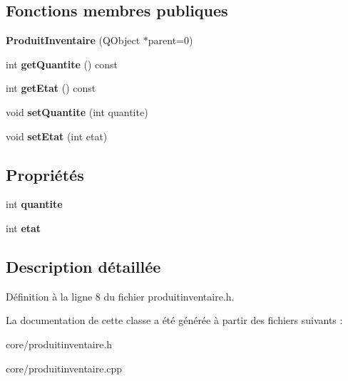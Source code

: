 \subsection*{Fonctions membres publiques}
\begin{DoxyCompactItemize}
\item 
\hypertarget{class_core_1_1_produit_inventaire_a9e523fdd7b5989520a88066561017121}{
{\bfseries ProduitInventaire} (QObject $\ast$parent=0)}
\label{d4/d53/class_core_1_1_produit_inventaire_a9e523fdd7b5989520a88066561017121}

\item 
\hypertarget{class_core_1_1_produit_inventaire_a10e08d895e2513a59fea74e580aac7e8}{
int {\bfseries getQuantite} () const }
\label{d4/d53/class_core_1_1_produit_inventaire_a10e08d895e2513a59fea74e580aac7e8}

\item 
\hypertarget{class_core_1_1_produit_inventaire_ad5dd92f4476fad4757cb10462f4eefb1}{
int {\bfseries getEtat} () const }
\label{d4/d53/class_core_1_1_produit_inventaire_ad5dd92f4476fad4757cb10462f4eefb1}

\item 
\hypertarget{class_core_1_1_produit_inventaire_a59d68c5950101aa30a9ce8dc7a4b0e45}{
void {\bfseries setQuantite} (int quantite)}
\label{d4/d53/class_core_1_1_produit_inventaire_a59d68c5950101aa30a9ce8dc7a4b0e45}

\item 
\hypertarget{class_core_1_1_produit_inventaire_aff84b8ce540258afbbfb958fd54ed316}{
void {\bfseries setEtat} (int etat)}
\label{d4/d53/class_core_1_1_produit_inventaire_aff84b8ce540258afbbfb958fd54ed316}

\end{DoxyCompactItemize}
\subsection*{Propriétés}
\begin{DoxyCompactItemize}
\item 
\hypertarget{class_core_1_1_produit_inventaire_a7059db71032dbbeb3391fd6fdd6d9ea7}{
int {\bfseries quantite}}
\label{d4/d53/class_core_1_1_produit_inventaire_a7059db71032dbbeb3391fd6fdd6d9ea7}

\item 
\hypertarget{class_core_1_1_produit_inventaire_af550b34aacf39149fc19257bcb990b27}{
int {\bfseries etat}}
\label{d4/d53/class_core_1_1_produit_inventaire_af550b34aacf39149fc19257bcb990b27}

\end{DoxyCompactItemize}


\subsection{Description détaillée}


Définition à la ligne 8 du fichier produitinventaire.h.



La documentation de cette classe a été générée à partir des fichiers suivants :\begin{DoxyCompactItemize}
\item 
core/produitinventaire.h\item 
core/produitinventaire.cpp\end{DoxyCompactItemize}
